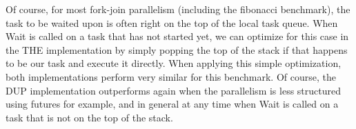 Of course, for most fork-join parallelism (including the fibonacci
benchmark), the task to be waited upon is often right on the top of
the local task queue. When Wait is called on a task that has not
started yet, we can optimize for this case in the THE implementation
by simply popping the top of the stack if that happens to be our task
and execute it directly. When applying this simple optimization, both
implementations perform very similar for this benchmark. Of course,
the DUP implementation outperforms again when the parallelism is less
structured using futures for example, and in general at any time when
Wait is called on a task that is not on the top of the stack.



